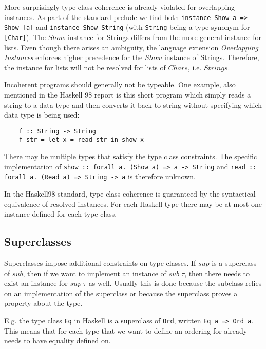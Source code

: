 More surprisingly type class coherence is already violated for overlapping instances.
As part of the standard prelude we find both \texttt{instance Show a => Show [a]} and \texttt{instance Show String}
(with \texttt{String} being a type synonym for \texttt{[Char]}).
The $\mathit{Show}$ instance for Strings differs from the more general instance for lists.
Even though there arises an ambiguity, the language extension \emph{Overlapping Instances} enforces higher precedence for the $Show$ instance of Strings.
Therefore, the instance for lists will not be resolved for lists of $Chars$, i.e. $Strings$.

Incoherent programs should generally not be typeable.
One example, also mentioned in the Haskell 98 report \cite{Haskell98} is this short program which simply reads a string to a data type and then converts it back to string without specifying which data type is being used:

\begin{verbatim}
    f :: String -> String
    f str = let x = read str in show x
\end{verbatim}

There may be multiple types that satisfy the type class constraints.
The specific implementation of \texttt{show :: forall a. (Show a) => a -> String} and \texttt{read :: forall a. (Read a) => String -> a} is therefore unknown.

In the Haskell98 standard, type class coherence is guaranteed by the syntactical equivalence of resolved instances.
For each Haskell type there may be at most one instance defined for each type class.


\subsection{Superclasses}

Superclasses impose additional constraints on type classes.
If $sup$ is a superclass of $sub$, then if we want to implement an instance of $sub \;\tau$, then there needs to exist an instance for $sup \;\tau$ as well.
Usually this is done because the subclass relies on an implementation of the superclass or because the superclass proves a property about the type.

E.g. the type class \texttt{Eq} in Haskell is a superclass of \texttt{Ord}, written \texttt{Eq a => Ord a}.
This means that for each type that we want to define an ordering for already needs to have equality defined on.

